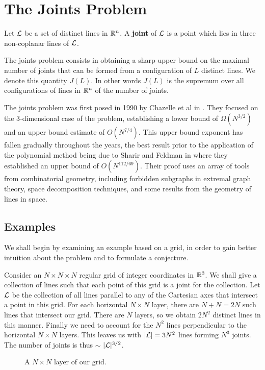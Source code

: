\chapter{The Joints Problem \label{chap:joints}}
\begin{definition}
    Let $\mathcal L$ be a set of distinct lines in $\mathbb R^n$. A \textbf{joint} of $\mathcal L$ is a point which lies in three non-coplanar lines of $\mathcal L$.
\end{definition}
The joints problem consists in obtaining a sharp upper bound on the maximal number of joints that can be formed from a configuration of $L$ distinct lines.
We denote this quantity $J(L)$. In other words $J(L)$ is the supremum over all configurations of lines in $\mathbb R^n$ of the number of joints.

The joints problem was first posed in 1990 by Chazelle et al in \cite{chazelle1990counting}. They focused on the 3-dimensional case of the problem, establishing a lower bound of $\Omega (N^{3/2})$ and an upper bound estimate of $O(N^{7/4})$. 
This upper bound exponent has fallen gradually throughout the years, the best result prior to the application of the polynomial method being due to Sharir and Feldman in \cite{feldman2005improved} where they established an upper bound of $O(N^{112/69})$. Their
proof uses an array of tools from combinatorial geometry, including forbidden subgraphs in extremal graph theory, space decomposition techniques, and some results from the geometry of lines in space.

\section{Examples}
We shall begin by examining an example based on a grid, in order to gain better intuition about the problem and to formulate a conjecture. 
\begin{example}Consider an $N \times N \times N$ regular grid of integer coordinates in $\mathbb R^3$. We shall give a collection of lines such that each point of this grid is a joint for the collection.
Let $\mathcal L$ be the collection of all lines parallel to any of the Cartesian axes that intersect a point in this grid.
For each horizontal $N \times N$ layer, there are $N+N = 2N$ such lines that intersect our grid. 
There are $N$ layers, so we obtain $2N^2$ distinct lines in this manner. Finally we need to account for the $N^2$ lines perpendicular to the horizontal $N\times N$ layers.
This leaves us with $|\mathcal L| = 3 N^2$ lines forming $N^3$ joints. The number of joints is thus $\sim$ $|\mathcal L|^{3/2}$. 
\end{example}
\begin{figure}[h]
    \centering
{}
\caption{A $N \times N$ layer of our grid.}
\end{figure}

